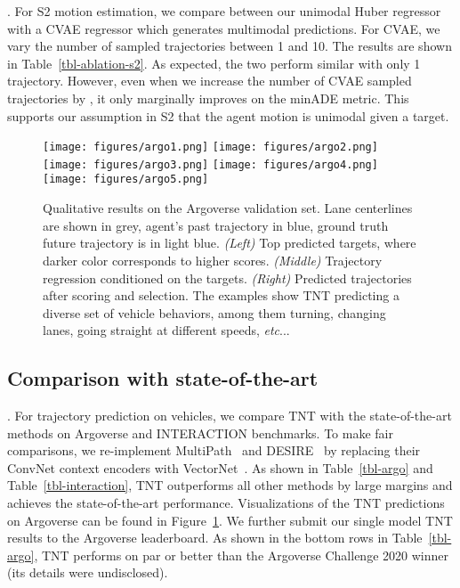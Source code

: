\documentclass{article}
\makeatletter
\DeclareRobustCommand\onedot{\futurelet\@let@token\@onedot}
\def\@onedot{\ifx\@let@token.\else.\null\fi\xspace}
\newcommand{\model}{TNT\xspace}
\def\etc{\emph{etc}\onedot} \def\vs{\emph{vs}\onedot}
\makeatother
\begin{document}
. For S2 motion estimation, we compare between our unimodal Huber regressor with a CVAE regressor which generates multimodal predictions. For CVAE, we vary the number of sampled trajectories between 1 and 10. The results are shown in Table~\ref{tbl-ablation-s2}. As expected, the two perform similar with only 1 trajectory. However, even when we increase the number of CVAE sampled trajectories by , it only marginally improves on the minADE metric. This supports our assumption in S2 that the agent motion is unimodal given a target.

\begin{figure}[t]
    \centering
    \texttt{[image: figures/argo1.png]}\hfill
    \texttt{[image: figures/argo2.png]}\hfill
    \texttt{[image: figures/argo3.png]}\hfill
    \texttt{[image: figures/argo4.png]}\hfill
    \texttt{[image: figures/argo5.png]}
    \caption{Qualitative results on the Argoverse validation set. Lane centerlines are shown in grey, agent's past trajectory in blue, ground truth future trajectory is in light blue. {\it(Left)} Top predicted targets, where darker color corresponds to higher scores. {\it(Middle)} Trajectory regression conditioned on the targets. {\it(Right)} Predicted trajectories after scoring and selection. The examples show \model predicting a diverse set of vehicle behaviors, among them turning, changing lanes, going straight at different speeds, \etc.}\label{fig:viz}
\end{figure}

\subsection{Comparison with state-of-the-art}

. For trajectory prediction on vehicles, we compare \model with the state-of-the-art methods on Argoverse and INTERACTION benchmarks.
To make fair comparisons, we re-implement MultiPath~\cite{chai2019multipath} and DESIRE~\cite{DESIRE} by replacing their ConvNet context encoders with VectorNet~\cite{gao2020vectornet}. As shown in Table~\ref{tbl-argo} and Table~\ref{tbl-interaction}, \model outperforms all other methods by large margins and achieves the  state-of-the-art performance. Visualizations of the \model predictions on Argoverse can be found in Figure~\ref{fig:viz}.
We further submit our single model \model results to the Argoverse leaderboard. As shown in the bottom rows in Table~\ref{tbl-argo}, \model performs on par or better than the Argoverse Challenge 2020 winner (its details were undisclosed).
\end{document}

